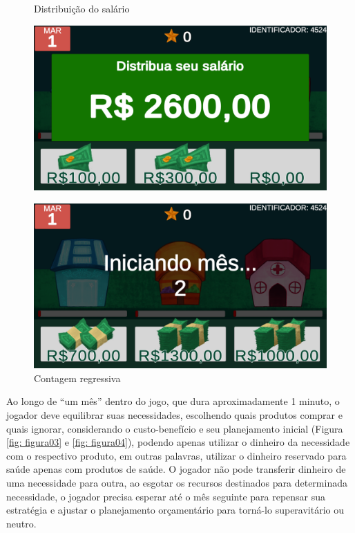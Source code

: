 \graphicspath{{figuras/}}
\begin{figure}[!ht]
\center
\begin{minipage}{0.4\linewidth}
\center
\caption{Distribuição do salário} \label{fig: figura01}
\includegraphics[width=1.0\linewidth]{01-figura_distribuicao-salario.png}
\end{minipage}
\begin{minipage}{0.4\linewidth}
\center
\caption{Contagem regressiva} \label{fig: figura02}
\includegraphics[width=1.0\linewidth]{02-figura_contagem-regressiva-mes.png}
\end{minipage}
\end{figure}

Ao longo de “um mês” dentro do jogo, que dura aproximadamente 1 minuto, o jogador deve equilibrar suas necessidades, escolhendo quais produtos comprar e quais ignorar, considerando o custo-benefício e seu planejamento inicial (Figura \ref{fig: figura03} e \ref{fig: figura04}), podendo apenas utilizar o dinheiro da necessidade com o respectivo produto, em outras palavras, utilizar o dinheiro reservado para saúde apenas com produtos de saúde. O jogador não pode transferir dinheiro de uma necessidade para outra, ao esgotar os recursos destinados para determinada necessidade, o jogador precisa esperar até o mês seguinte para repensar sua estratégia e ajustar o planejamento orçamentário para torná-lo superavitário ou neutro.

